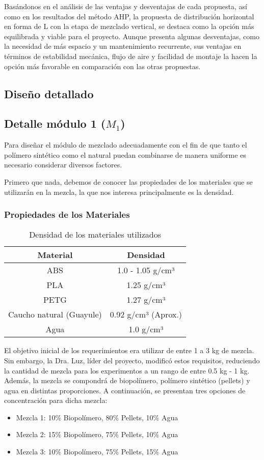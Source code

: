 \documentclass[14pt,oneside]{extarticle} %
\begin{document}
Basándonos en el análisis de las ventajas y desventajas de cada propuesta, así como en los resultados del método AHP, la propuesta de distribución horizontal en forma de L con la etapa de mezclado vertical, se destaca como la opción más equilibrada y viable para el proyecto. Aunque presenta algunas desventajas, como la necesidad de más espacio y un mantenimiento recurrente, sus ventajas en términos de estabilidad mecánica, flujo de aire y facilidad de montaje la hacen la opción más favorable en comparación con las otras propuestas.

\subsection{Diseño detallado}

\subsection{Detalle módulo 1 ($M_1$)}

Para diseñar el módulo de mezclado adecuadamente con el fin de que tanto el polímero sintético como el natural puedan combinarse de manera uniforme es necesario considerar diversos factores.

Primero que nada, debemos de conocer las propiedades de los materiales que se utilizarán en la mezcla, la que nos interesa principalmente es la densidad.

\subsubsection{Propiedades de los Materiales}

\begin{table}[h!]
\centering
\begin{tabular}{|c|c|}
\hline
Material & Densidad \\
\hline
ABS & 1.0 - 1.05 g/cm³ \\
PLA & 1.25 g/cm³ \\
PETG & 1.27 g/cm³ \\
Caucho natural (Guayule) & 0.92 g/cm³ (Aprox.) \\
Agua & 1.0 g/cm³ \\
\hline
\end{tabular}
\caption{Densidad de los materiales utilizados}
\end{table}

El objetivo inicial de los requerimientos era utilizar de entre 1 a 3 kg de mezcla. Sin embargo, la Dra. Luz, líder del proyecto, modificó estos requisitos, reduciendo la cantidad de mezcla para los experimentos a un rango de entre 0.5 kg - 1 kg. Además, la mezcla se compondrá de biopolímero, polímero sintético (pellets) y agua en distintas proporciones. A continuación, se presentan tres opciones de concentración para dicha mezcla:
\begin{itemize}
    \item Mezcla 1: 10\% Biopolímero, 80\% Pellets, 10\% Agua
    \item Mezcla 2: 15\% Biopolímero, 75\% Pellets, 10\% Agua
    \item Mezcla 3: 10\% Biopolímero, 75\% Pellets, 15\% Agua
\end{itemize}
\end{document}
